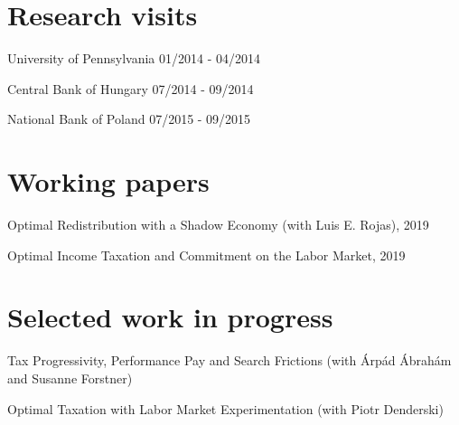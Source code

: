 \documentclass[letterpaper]{article}
\renewenvironment{itemize}{
  \begin{list}{}{
    \setlength{\leftmargin}{1.5em}
  }
}{
  \end{list}
}
\begin{document}
\section*{Research visits}

\begin{itemize}
  \item University of Pennsylvania \hfill  01/2014 - 04/2014
  \item Central Bank of Hungary \hfill  07/2014 - 09/2014
  \item National Bank of Poland \hfill  07/2015 - 09/2015

\end{itemize}


  




\section*{Working papers}


\begin{itemize}
\item Optimal Redistribution with a Shadow Economy (with Luis E. Rojas), 2019
\item Optimal Income Taxation and Commitment on the Labor Market, 2019
\end{itemize}

\section*{Selected work in progress}

\begin{itemize}
\item Tax Progressivity, Performance Pay and Search Frictions (with \'{A}rp\'{a}d \'{A}brah\'{a}m and Susanne Forstner)
\item Optimal Taxation with Labor Market Experimentation (with Piotr Denderski)
\end{itemize}
\end{document}
